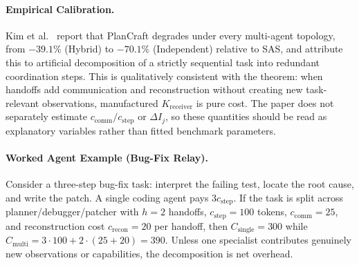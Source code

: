 \paragraph{Empirical Calibration.} Kim et al.~\cite{kim2025scaling} report that PlanCraft degrades under every multi-agent topology, from $-39.1\%$ (Hybrid) to $-70.1\%$ (Independent) relative to SAS, and attribute this to artificial decomposition of a strictly sequential task into redundant coordination steps. This is qualitatively consistent with the theorem: when handoffs add communication and reconstruction without creating new task-relevant observations, manufactured $K_{\mathrm{receiver}}$ is pure cost. The paper does not separately estimate $c_{\mathrm{comm}}/c_{\mathrm{step}}$ or $\Delta I_j$, so these quantities should be read as explanatory variables rather than fitted benchmark parameters.

\paragraph{Worked Agent Example (Bug-Fix Relay).}
Consider a three-step bug-fix task: interpret the failing test, locate the root cause, and write the patch. A single coding agent pays $3c_{\mathrm{step}}$. If the task is split across planner/debugger/patcher with $h=2$ handoffs, $c_{\mathrm{step}}=100$ tokens, $c_{\mathrm{comm}}=25$, and reconstruction cost $c_{\mathrm{recon}}=20$ per handoff, then $C_{\mathrm{single}}=300$ while $C_{\mathrm{multi}}=3\cdot100+2\cdot(25+20)=390$. Unless one specialist contributes genuinely new observations or capabilities, the decomposition is net overhead.

